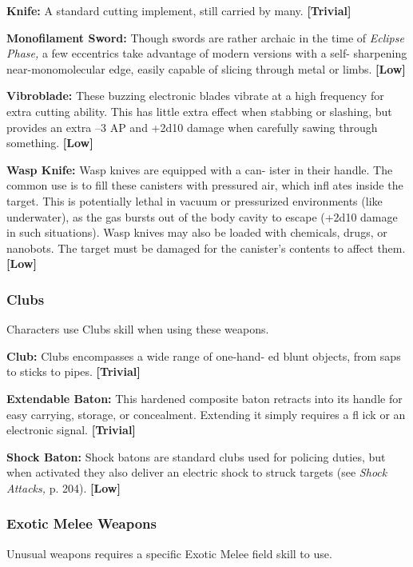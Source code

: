 \textbf{Knife:} A standard cutting implement, still carried 
by many. \textbf{[Trivial]}

\textbf{Monofilament  Sword:} Though swords are rather 
archaic in the time of \textit{Eclipse Phase,} a few eccentrics 
take advantage of modern versions with a self-
sharpening near-monomolecular edge, easily capable 
of slicing through metal or limbs. \textbf{[Low]}

\textbf{Vibroblade:} These buzzing electronic blades vibrate 
at a high frequency for extra cutting ability. This 
has little extra effect when stabbing or slashing, but 
provides an extra –3 AP and +2d10 damage when 
carefully sawing through something. \textbf{[Low]}

\textbf{Wasp Knife:} Wasp knives are equipped with a can-
ister in their handle. The common use is to fill these 
canisters with pressured air, which infl ates  inside 
the target. This is potentially lethal in vacuum or 
pressurized environments (like underwater), as the 
gas bursts out of the body cavity to escape (+2d10 
damage in such situations). Wasp knives may also 
be loaded with chemicals, drugs, or nanobots. The 
target must be damaged for the canister's contents to 
affect them. \textbf{[Low]}

\subsubsection{Clubs}

Characters use Clubs skill when using these weapons.

\textbf{Club:} Clubs encompasses a wide range of one-hand-
ed blunt objects, from saps to sticks to pipes. \textbf{[Trivial]}

\textbf{Extendable Baton:} This hardened composite baton 
retracts into its handle for easy carrying, storage, or 
concealment. Extending it simply requires a fl ick or 
an electronic signal. \textbf{[Trivial]}

\textbf{Shock Baton:} Shock batons are standard clubs 
used for policing duties, but when activated they also 
deliver an electric shock to struck targets (see \textit{Shock }
\textit{Attacks,} p. 204). \textbf{[Low]}

\subsubsection{Exotic Melee Weapons}

Unusual weapons requires a specific Exotic Melee 
field skill to use.

